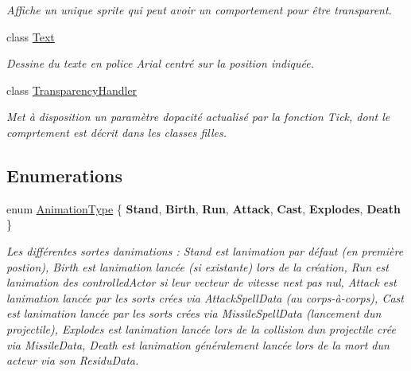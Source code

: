\begin{DoxyCompactItemize}
\begin{DoxyCompactList}\small\item\em Affiche un unique sprite qui peut avoir un comportement pour être transparent. \end{DoxyCompactList}\item 
class \hyperlink{class_tentacle_slicers_1_1graphics_1_1_text}{Text}
\begin{DoxyCompactList}\small\item\em Dessine du texte en police Arial centré sur la position indiquée. \end{DoxyCompactList}\item 
class \hyperlink{class_tentacle_slicers_1_1graphics_1_1_transparency_handler}{Transparency\+Handler}
\begin{DoxyCompactList}\small\item\em Met à disposition un paramètre d\textquotesingle{}opacité actualisé par la fonction Tick, dont le comprtement est décrit dans les classes filles. \end{DoxyCompactList}\end{DoxyCompactItemize}
\subsection*{Enumerations}
\begin{DoxyCompactItemize}
\item 
enum \hyperlink{namespace_tentacle_slicers_1_1graphics_a9c92bd633d714099730f10897a01950b}{Animation\+Type} \{ \newline
{\bfseries Stand}, 
{\bfseries Birth}, 
{\bfseries Run}, 
{\bfseries Attack}, 
\newline
{\bfseries Cast}, 
{\bfseries Explodes}, 
{\bfseries Death}
 \}\begin{DoxyCompactList}\small\item\em Les différentes sortes d\textquotesingle{}animations \+: Stand est l\textquotesingle{}animation par défaut (en première postion), Birth est l\textquotesingle{}animation lancée (si existante) lors de la création, Run est l\textquotesingle{}animation des controlled\+Actor si leur vecteur de vitesse n\textquotesingle{}est pas nul, Attack est l\textquotesingle{}animation lancée par les sorts crées via Attack\+Spell\+Data (au corps-\/à-\/corps), Cast est l\textquotesingle{}animation lancée par les sorts crées via Missile\+Spell\+Data (lancement d\textquotesingle{}un projectile), Explodes est l\textquotesingle{}animation lancée lors de la collision d\textquotesingle{}un projectile crée via Missile\+Data, Death est l\textquotesingle{}animation généralement lancée lors de la mort d\textquotesingle{}un acteur via son Residu\+Data. \end{DoxyCompactList}
\end{DoxyCompactItemize}


